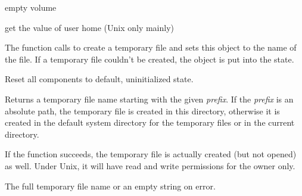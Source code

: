 
\label{wxfilenameassigndir}


empty volume


\label{wxfilenameassignhomedir}


get the value of user home (Unix only mainly)


\label{wxfilenameassigntempfilename}


The function calls  to
create a temporary file and sets this object to the name of the file. If a
temporary file couldn't be created, the object is put into the\rtfsp
{} state.

\label{wxfilenameclear}


Reset all components to default, uninitialized state.

\label{wxfilenamecreatetempfilename}


Returns a temporary file name starting with the given {\it prefix}. If
the {\it prefix} is an absolute path, the temporary file is created in this
directory, otherwise it is created in the default system directory for the
temporary files or in the current directory.

If the function succeeds, the temporary file is actually created (but not
opened) as well. Under Unix, it will have read and write permissions for the
owner only.


The full temporary file name or an empty string on error.

\label{wxfilenamedirexists}



